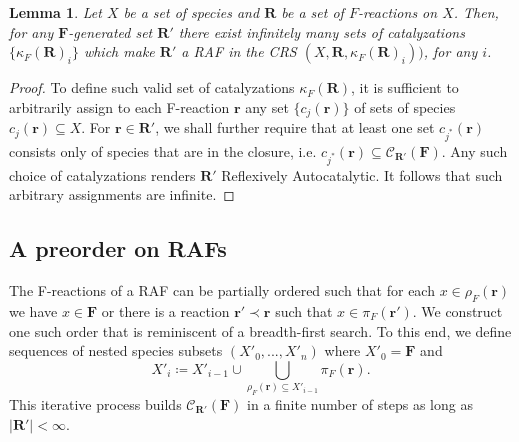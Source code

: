 \documentclass[pdflatex]{sn-jnl}
\theoremstyle{thmstyleone}%
\newtheorem{lemma}[theorem]{Lemma}%
\theoremstyle{examplesty}%
\theoremstyle{thmstylethree}%
\newcommand{\food}{\ensuremath{\mathbf{F}}}
\newcommand{\closure}[2]{\mathscr{C}_{#1}(#2)}
\newcommand{\FR}[0]{\mathbf{R}}
\newcommand{\fr}[0]{\mathbf{r}}
\newcommand{\RAF}[0]{\mathbf{R}'}
\newcommand{\cat}{\kappa_F}
\newcommand{\feducts}{\rho_F}
\newcommand{\fproducts}{\pi_F}
\begin{document}
\vspace{6pt}
\begin{lemma}\label{lem:ArbCat}
  Let $X$ be a set of species and $\FR$ be a set of $F$-reactions on
  $X$. Then, for any $\food$-generated set $\RAF$ there exist infinitely
  many sets of catalyzations $\{\cat(\FR)_i\}$ which make $\RAF$ a RAF in
  the CRS $(X,\FR,\cat (\FR)_i))$, for any $i$.
\end{lemma}
\begin{proof}
  To define such valid set of catalyzations $\cat(\FR)$, it is sufficient
  to arbitrarily assign to each F-reaction $\mathbf{r}$ any set
  $\{c_j(\fr)\}$ of sets of species $c_j(\fr)\subseteq X$. For
  $\mathbf{r}\in \RAF$, we shall further require that at least one set
  $c_{j^*}(\fr)$ consists only of species that are in the closure,
  i.e. ${c_{j^*}}(\fr)\subseteq \closure{\RAF}{\food}$. Any such choice of
  catalyzations renders $\RAF$ Reflexively Autocatalytic. It follows that
  such arbitrary assignments are infinite.
\end{proof}

\subsection{A preorder on RAFs}

The F-reactions of a RAF can be partially ordered such that for each
$x\in\feducts(\mathbf{r})$ we have $x\in\food$ or there is a reaction
$\mathbf{r}'\prec \mathbf{r}$ such that $x\in\fproducts(\mathbf{r}')$.  We
construct one such order that is reminiscent of a breadth-first search.  To
this end, we define sequences of nested species subsets $(X'_0, ..., X'_n)$
where $X'_0=\food$ and
\begin{equation}\label{eq:speciesSubSet}
  X'_i\coloneqq X'_{i-1}\cup \bigcup_{\feducts(\mathbf r)\subseteq X'_{i-1}}
  \fproducts(\mathbf r).
\end{equation}
This iterative process builds $\closure{\RAF}{\food}$ in a finite number of
steps as long as $\vert \RAF\vert
<\infty$.
\end{document}
